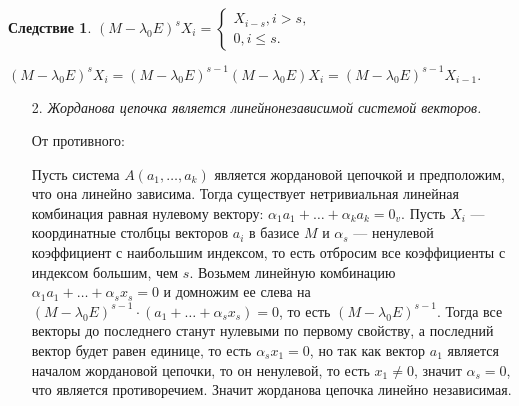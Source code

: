 \newtheorem*{cor12_10_1}{Следствие}\begin{cor12_10_1}	$(M - \lambda_0 E)^s X_i = \begin{cases}X_{i-s}, i > s,\\ 0, i \leqslant s. \end{cases}$\begin{Proof}
		$(M - \lambda_0 E)^s X_i = (M - \lambda_0 E)^{s-1}(M - \lambda_0 E) X_i = (M - \lambda_0 E)^{s-1} X_{i-1}.$
	\end{Proof}
\end{cor12_10_1}
\begin{enumerate}
	\item[2.] \textit{Жорданова цепочка является линейнонезависимой системой векторов.}\begin{Proof}
		От противного:
		
		Пусть система $A(a_1, \dots, a_k)$ является жордановой цепочкой и предположим, что она линейно зависима. Тогда существует нетривиальная линейная комбинация равная нулевому вектору: $\alpha_1 a_1 + \ldots + \alpha_k a_k = 0_v$. Пусть $X_i$ --- координатные столбцы векторов $a_i$ в базисе $M$ и $\alpha_s$ --- ненулевой коэффициент с наибольшим индексом, то есть отбросим все коэффициенты с индексом большим, чем $s$. Возьмем линейную комбинацию $ \alpha_1 a_1 + \ldots + \alpha_s x_s = 0$ и домножим ее слева на $(M - \lambda_0 E)^{s-1}\cdot(a_1 + \ldots + \alpha_s x_s) = 0$, то есть $(M - \lambda_0 E)^{s-1}$. Тогда все векторы до последнего станут нулевыми по первому свойству, а последний вектор будет равен единице, то есть $\alpha_s x_1 = 0$, но так как вектор $a_1$ является началом жордановой цепочки, то он ненулевой, то есть $x_1 \ne 0$, значит $\alpha_s = 0$, что является противоречием. Значит жорданова цепочка линейно независимая.
	\end{Proof}
	

\end{enumerate}

